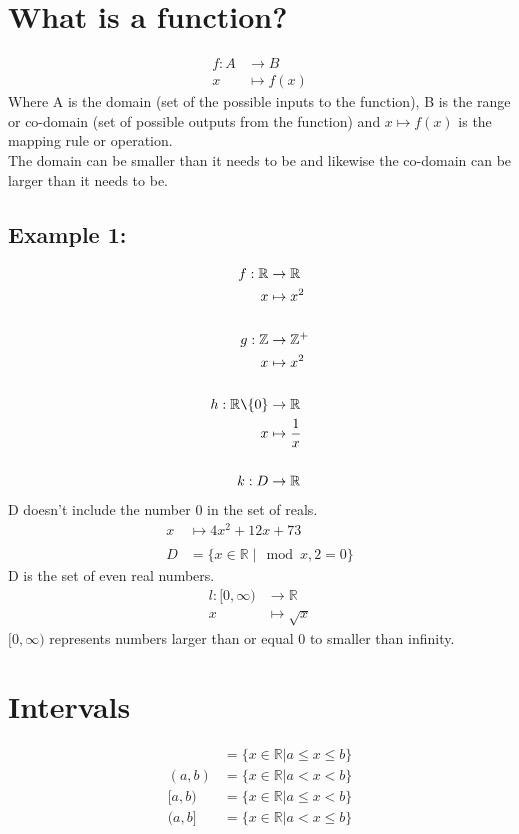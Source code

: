 \documentclass[class=article, crop=false]{standalone}
\begin{document}
\section*{What is a function?}
\begin{align*}
f: A & \rightarrow B \\
x & \mapsto f(x)
\end{align*}
Where A is the domain (set of the possible inputs to the function), B is the range or co-domain (set of possible outputs from the function) and $x \mapsto f(x)$ is the mapping rule or operation. \\
The domain can be smaller than it needs to be and likewise the co-domain can be larger than it needs to be. 
\subsection*{Example 1:}
\begin{align*}
f: \mathbb{R} & \rightarrow \mathbb{R} \\
x & \mapsto x^2 \\\\
g: \mathbb{Z} & \rightarrow \mathbb{Z}^+ \\
x & \mapsto x^2 \\\\
h: \mathbb{R} \texttt{\char`\\} \{0\} & \rightarrow \mathbb{R} \\
x & \mapsto \frac{1}{x} \\\\
k: D & \rightarrow \mathbb{R} \\
\end{align*}
D doesn't include the number 0 in the set of reals.
\begin{align*}
x & \mapsto 4x^2 + 12x + 73 \\\\
D & = \{x \in \mathbb{R} \; \vert \mod{x,2} = 0 \}
\end{align*}
D is the set of even real numbers. 
\begin{align*}
l: [0,\infty) & \rightarrow \mathbb{R} \\
x & \mapsto \sqrt{x} 
\end{align*}
$[0,\infty)$ represents numbers larger than or equal 0 to smaller than infinity.
\section*{Intervals}
\begin{align*}
[a,b] & = \{ x \in \mathbb{R} \vert a \leqslant x \leqslant b \} \\
(a,b) & = \{ x \in \mathbb{R} \vert a < x < b \} \\
[a,b) & = \{ x \in \mathbb{R} \vert a \leqslant x < b \} \\
(a,b] & = \{ x \in \mathbb{R} \vert a < x \leqslant b \} \\
\end{align*}
\end{document}
